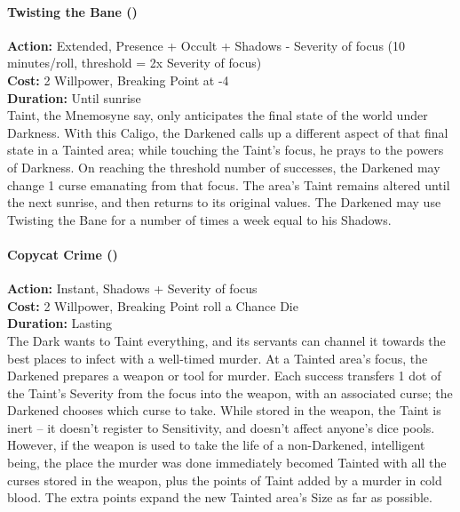 \paragraph*{Twisting the Bane (\textbullet\textbullet\textbullet)}

\noindent \textbf{Action:} Extended, Presence + Occult + Shadows - Severity of focus (10 minutes/roll, threshold = 2x Severity of focus)\\

\noindent \textbf{Cost:} 2 Willpower, Breaking Point at -4\\

\noindent \textbf{Duration:} Until sunrise \\

Taint, the Mnemosyne say, only anticipates the final state of the world under Darkness. With this Caligo, the Darkened calls up a different aspect of that final state in a Tainted area; while touching the Taint's focus, he prays to the powers of Darkness. On reaching the threshold number of successes, the Darkened may change 1 curse emanating from that focus. The area's Taint remains altered until the next sunrise, and then returns to its original values. The Darkened may use Twisting the Bane for a number of times a week equal to his Shadows. \\

\paragraph*{Copycat Crime (\textbullet\textbullet\textbullet\textbullet)}

\noindent \textbf{Action:} Instant, Shadows + Severity of focus\\

\noindent \textbf{Cost:} 2 Willpower, Breaking Point roll a Chance Die\\

\noindent \textbf{Duration:} Lasting \\

\noindent The Dark wants to Taint everything, and its servants can channel it towards the best places to infect with a well-timed murder. At a Tainted area's focus, the Darkened prepares a weapon or tool for murder. Each success transfers 1 dot of the Taint's Severity from the focus into the weapon, with an associated curse; the Darkened chooses which curse to take. While stored in the weapon, the Taint is inert -- it doesn't register to Sensitivity, and doesn't affect anyone's dice pools. However, if the weapon is used to take the life of a non-Darkened, intelligent being, the place the murder was done immediately becomed Tainted with all the curses stored in the weapon, plus the points of Taint added by a murder in cold blood. The extra points expand the new Tainted area's Size as far as possible.

